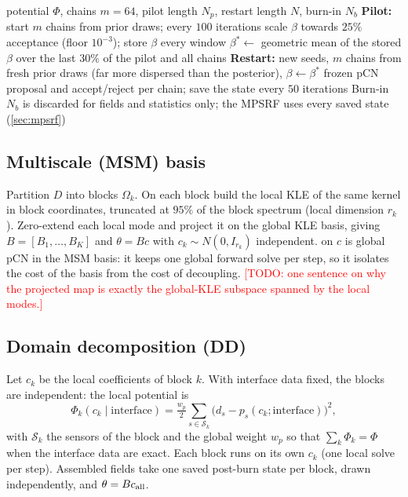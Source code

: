 \documentclass[11pt]{article}
\newcommand{\todo}[1]{\textcolor{red}{[TODO: #1]}}
\begin{document}
\begin{algorithm}[h]
\caption{Tune-then-restart pCN (global, or one block of a decomposition)}\label{alg:pcn}
\begin{algorithmic}[1]
\Require potential $\Phi$, chains $m=64$, pilot length $N_p$, restart length $N$, burn-in $N_b$
\State \textbf{Pilot:} start $m$ chains from prior draws; every $100$ iterations scale $\beta$ towards $25\%$ acceptance (floor $10^{-3}$); store $\beta$ every window
\State $\beta^\ast\gets$ geometric mean of the stored $\beta$ over the last $30\%$ of the pilot and all chains
\State \textbf{Restart:} new seeds, $m$ chains from fresh prior draws (far more dispersed than the posterior), $\beta\gets\beta^\ast$ frozen
  \State pCN proposal and accept/reject per chain; save the state every $50$ iterations
\EndFor
\State Burn-in $N_b$ is discarded for fields and statistics only; the MPSRF uses every saved state (\cref{sec:mpsrf})
\end{algorithmic}
\end{algorithm}

\subsection{Multiscale (MSM) basis}\label{sec:msm}
Partition $D$ into blocks $\Omega_k$. On each block build the local KLE of the same kernel in block coordinates, truncated at $95\%$ of the block spectrum (local dimension $r_k$). Zero-extend each local mode and project it on the global KLE basis, giving $B=[B_1,\dots,B_K]$ and $\theta=Bc$ with $c_k\sim N(0,I_{r_k})$ independent.  on $c$ is global pCN in the MSM basis: it keeps one global forward solve per step, so it isolates the cost of the basis from the cost of decoupling. \todo{one sentence on why the projected map is exactly the global-KLE subspace spanned by the local modes.}

\subsection{Domain decomposition (DD)}\label{sec:dd}
Let $c_k$ be the local coefficients of block $k$. With interface data fixed, the blocks are independent: the local potential is
\begin{equation}
\Phi_k(c_k\mid\text{interface})=\tfrac{w_p}{2}\sum_{s\in\mathcal S_k}\bigl(d_s-p_s(c_k;\text{interface})\bigr)^2,
\end{equation}
with $\mathcal S_k$ the sensors of the block and the global weight $w_p$ so that $\sum_k\Phi_k=\Phi$ when the interface data are exact. Each block runs  on its own $c_k$ (one local solve per step). Assembled fields take one saved post-burn state per block, drawn independently, and $\theta=Bc_{\rm all}$.
\end{document}
